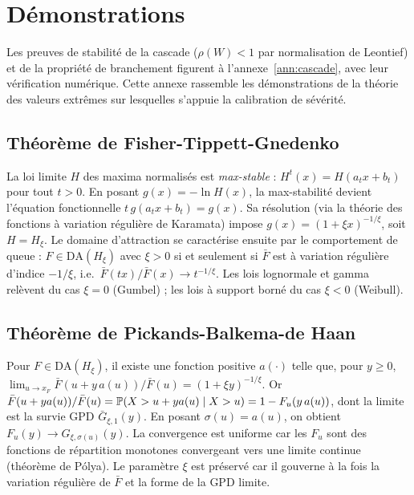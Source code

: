 \chapter{Démonstrations}

\noindent Les preuves de stabilité de la cascade ($\rho(W)<1$ par normalisation de Leontief) et
de la propriété de branchement figurent à l'annexe~\ref{ann:cascade}, avec leur vérification
numérique. Cette annexe rassemble les démonstrations de la théorie des valeurs extrêmes sur
lesquelles s'appuie la calibration de sévérité.

\section{Théorème de Fisher-Tippett-Gnedenko}
\label{soc:ann:ftg}
La loi limite $H$ des maxima normalisés est \emph{max-stable} : $H^t(x)=H(a_tx+b_t)$ pour tout $t>0$. En posant $g(x)=-\ln H(x)$, la max-stabilité devient l'équation fonctionnelle $t\,g(a_tx+b_t)=g(x)$. Sa résolution (via la théorie des fonctions à variation régulière de Karamata) impose $g(x)=(1+\xi x)^{-1/\xi}$, soit $H=H_\xi$. Le domaine d'attraction se caractérise ensuite par le comportement de queue : $F\in\mathrm{DA}(H_\xi)$ avec $\xi>0$ si et seulement si $\bar F$ est à variation régulière d'indice $-1/\xi$, i.e.\ $\bar F(tx)/\bar F(x)\to t^{-1/\xi}$. Les lois lognormale et gamma relèvent du cas $\xi=0$ (Gumbel) ; les lois à support borné du cas $\xi<0$ (Weibull).


\section{Théorème de Pickands-Balkema-de Haan}
\label{soc:ann:balkema}
Pour $F\in\mathrm{DA}(H_\xi)$, il existe une fonction positive $a(\cdot)$ telle que, pour $y\ge0$,
$\lim_{u\to x_F}\bar F(u+y\,a(u))/\bar F(u)=(1+\xi y)^{-1/\xi}$.
Or $\bar F(u+ya(u))/\bar F(u)=\mathbb{P}(X>u+ya(u)\mid X>u)=1-F_u(y\,a(u))$, dont la limite est la survie GPD $\bar G_{\xi,1}(y)$. En posant $\sigma(u)=a(u)$, on obtient $F_u(y)\to G_{\xi,\sigma(u)}(y)$. La convergence est uniforme car les $F_u$ sont des fonctions de répartition monotones convergeant vers une limite continue (théorème de Pólya). Le paramètre $\xi$ est préservé car il gouverne à la fois la variation régulière de $\bar F$ et la forme de la GPD limite.



